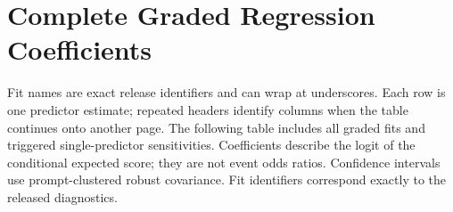 \endgroup

\section{Complete Graded Regression Coefficients}

Fit names are exact release identifiers and can wrap at underscores. Each row is one predictor estimate; repeated headers identify columns when the table continues onto another page. The following table includes all graded fits and triggered single-predictor sensitivities. Coefficients describe the logit of the conditional expected score; they are not event odds ratios. Confidence intervals use prompt-clustered robust covariance. Fit identifiers correspond exactly to the released diagnostics.

\begingroup\footnotesize\setlength{\tabcolsep}{3pt}\renewcommand{\arraystretch}{1.12}

